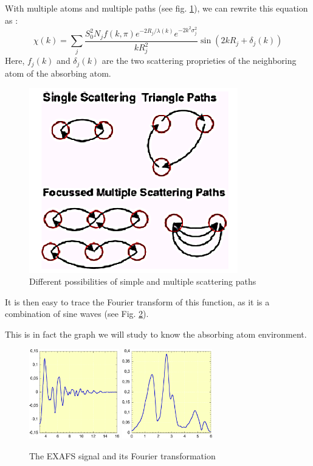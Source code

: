 \documentclass[11pt,a4paper,oneside]{report}
\begin{document}
With multiple atoms and multiple paths (see fig. \ref{exafsmultiplepaths}), we can rewrite this equation as :
\[  \chi(k) = \sum_j\frac{S_0^2 N_j f(k,\pi) e^{-2R_j/\lambda(k)}e^{-2k^2\sigma_j^2}}{kR_j^2}\sin(2kR_j+\delta_j(k))
\]
Here, $f_j(k)$ and $\delta_j(k)$ are the two scattering proprieties of the neighboring atom of the absorbing atom.

\begin{figure}[H]
    \begin{center}
        \includegraphics[height=0.35\textwidth]{Images/multiplePaths}
        \caption{Different possibilities of simple and multiple scattering paths}
        \label{exafsmultiplepaths}
    \end{center}
\end{figure}

It is then easy to trace the Fourier transform of this function, as it is a combination of sine waves (see Fig. \ref{fouriertransform}).

This is in fact the graph we will study to know the absorbing atom environment.

\begin{figure}[H]
    \begin{center}
        \includegraphics[width=0.35\textwidth]{Images/BeforeFourier}
        \hspace{0.15\textwidth}
        \includegraphics[width=0.35\textwidth]{Images/AfterFourier}
        \caption{The EXAFS signal and its Fourier transformation}
        \label{fouriertransform}
    \end{center}
\end{figure}
\end{document}

